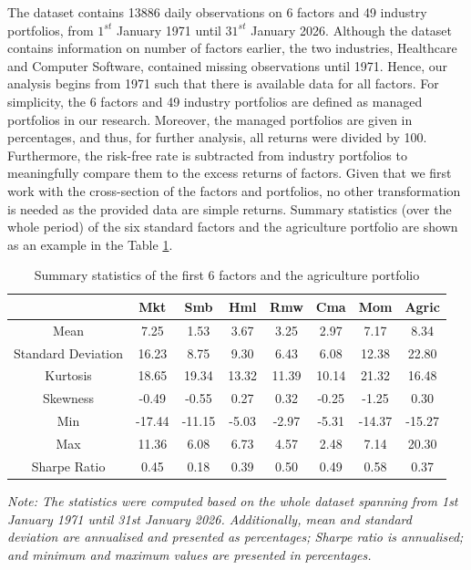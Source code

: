\documentclass[11pt]{article}
\begin{document}
The dataset contains 13886 daily observations on 6 factors and 49 industry portfolios, from $1^{st}$ January 1971 until $31^{st}$ January 2026. Although the dataset contains information on number of factors earlier, the two industries, Healthcare and Computer Software, contained missing observations until 1971. Hence, our analysis begins from 1971 such that there is available data for all factors. For simplicity, the 6 factors and 49 industry portfolios are defined as managed portfolios in our research. Moreover, the managed portfolios are given in percentages, and thus, for further analysis, all returns were divided by 100. Furthermore, the risk-free rate is subtracted from industry portfolios to meaningfully compare them to the excess returns of factors. Given that we first work with the cross-section of the factors and portfolios, no other transformation is needed as the provided data are simple returns. Summary statistics (over the whole period) of the six standard factors and the agriculture portfolio are shown as an example in the Table \ref{tab:summary_stats_of_7_main_factors}. 
\begin{table}[htbp]
    \centering
    \caption{Summary statistics of the first 6 factors and the agriculture portfolio}
    \label{tab:summary_stats_of_7_main_factors}
    \begin{tabular}{c|c|c|c|c|c|c|c}
    \hline
       ~ & Mkt & Smb & Hml & Rmw & Cma & Mom & Agric  \\ \hline
        Mean & 7.25 & 1.53 & 3.67 & 3.25 & 2.97 & 7.17 & 8.34  \\ 
        Standard Deviation & 16.23 & 8.75 & 9.30 & 6.43 & 6.08 & 12.38 & 22.80  \\ 
        Kurtosis & 18.65 & 19.34 & 13.32 & 11.39 & 10.14 & 21.32 & 16.48  \\ 
        Skewness & -0.49 & -0.55 & 0.27 & 0.32 & -0.25 & -1.25 & 0.30  \\ 
        Min & -17.44 & -11.15 & -5.03 & -2.97 & -5.31 & -14.37 & -15.27  \\ 
        Max & 11.36 & 6.08 & 6.73 & 4.57 & 2.48 & 7.14 & 20.30  \\ 
        Sharpe Ratio & 0.45 & 0.18 & 0.39 & 0.50 & 0.49 & 0.58 & 0.37 \\ \hline
    \end{tabular}
    \begin{minipage} {0.9\linewidth}
    \textit{{\small Note: The statistics were computed based on the whole dataset spanning from 1st January 1971 until 31st January 2026. Additionally, mean and standard deviation are annualised and presented as percentages; Sharpe ratio is annualised; and minimum and maximum values are presented in percentages.}}
\end{minipage}
\end{table}
\end{document}
